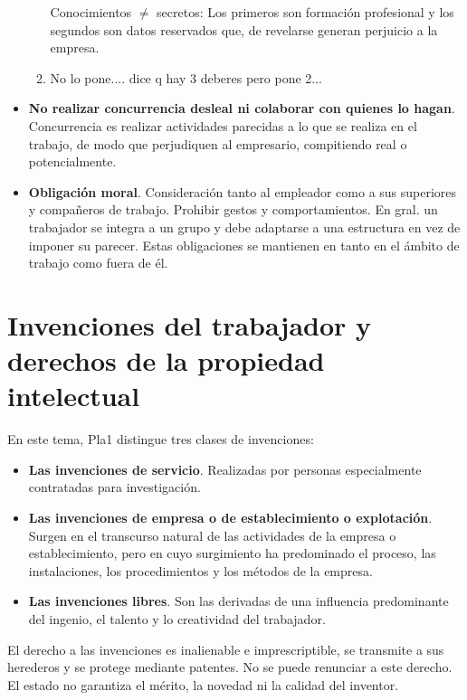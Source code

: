 \documentclass[spanish,12pt,a4paper,titlepage]{report}
\begin{document}
\begin{itemize}
\begin{enumerate}
		Conocimientos $\neq$ secretos: Los primeros son formación profesional y los segundos son datos reservados que, de revelarse generan perjuicio a la empresa.
		\item No lo pone.... dice q hay 3 deberes pero pone 2...
	\end{enumerate}
	\item \textbf{No realizar concurrencia desleal ni colaborar con quienes lo hagan}. Concurrencia es realizar actividades parecidas  a lo que se realiza en el trabajo, de modo que perjudiquen al empresario, compitiendo real o potencialmente.
	\item \textbf{Obligación moral}. Consideración tanto al empleador como a sus superiores y compañeros de trabajo.
	Prohibir gestos y comportamientos. En gral. un trabajador se integra a un grupo y debe adaptarse a una estructura en vez de imponer su parecer. 
	Estas obligaciones se mantienen en tanto en el ámbito de trabajo como fuera de él.
\end{itemize}

\section{Invenciones del trabajador y derechos de la propiedad intelectual}
En este tema, Pla1 distingue tres clases de invenciones: 
\begin{itemize}
	\item \textbf{Las invenciones de servicio}. Realizadas por personas especialmente contratadas para investigación.
	\item \textbf{Las invenciones de empresa o de establecimiento o explotación}. Surgen en el transcurso natural de las actividades de la empresa o establecimiento, pero en cuyo surgimiento ha predominado el proceso, las instalaciones, los procedimientos y los métodos de la empresa.
	\item \textbf{Las invenciones libres}. Son las derivadas de una influencia predominante del ingenio, el talento y lo creatividad del trabajador.
\end{itemize}
El derecho a las invenciones es inalienable e imprescriptible, se transmite a sus herederos y se protege mediante patentes.
No se puede renunciar a este derecho.
El estado no garantiza el mérito, la novedad ni la calidad del inventor.\\
\end{document}
